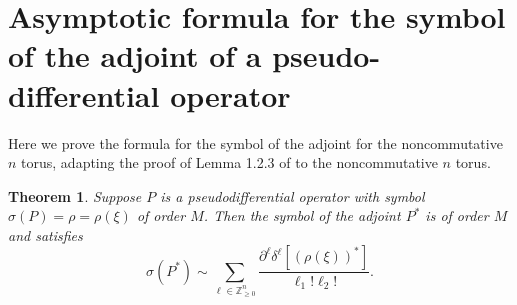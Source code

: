 \documentclass[10pt]{article}
\newtheorem{thm}{Theorem}[section]
\theoremstyle{remark}
\theoremstyle{definition}
\begin{document}
\section{Asymptotic formula for the symbol of the adjoint
of a pseudo-differential operator}
Here we prove the formula for the symbol of the adjoint for the noncommutative
$n$ torus, adapting the proof of Lemma 1.2.3 of \cite{gilkey} to the
noncommutative $n$ torus.
\begin{thm}\label{adj}
Suppose $P$ is a pseudodifferential operator with symbol
$\sigma(P)=\rho=\rho(\xi)$ of order $M$.
Then the symbol of the adjoint $P^*$ is of order $M$ and satisfies
$$\sigma(P^*)\sim\sum_{\ell\in\mathbb Z_{\ge 0}^n}
\frac{\partial^{\ell}\delta^{\ell}[(\rho(\xi))^*]}
{\ell_1!\ell_2!}.$$

\end{thm}
\end{document}
